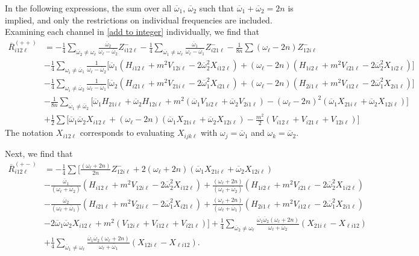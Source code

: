 \documentclass[letterpaper,11pt]{article}
\newcommand{\oi}{\omega_i}
\newcommand{\ol}{\omega_\ell}
\newcommand{\oone}{\overline{\omega}_1}
\newcommand{\otwo}{\overline{\omega}_2}
\begin{document}
In the following expressions, the sum over all $\oone$, $\otwo$ such that $\oone + \otwo = 2n$ is implied, and only the restrictions on individual frequencies are included. Examining each channel in \eqref{add to integer} individually, we find that
\begin{align}
\label{R1}
\overline{R}^{(++)}_{i 1 2 \ell} &= - \frac{1}{4} \sum_{\otwo \neq \ol} \frac{\otwo}{\ol - \otwo} Z^{-}_{i12\ell} - \frac{1}{4} \sum_{\oone \neq \ol} \frac{\oone}{\ol - \oone} Z^{-}_{i21\ell} - \frac{1}{8n} \sum \left( \ol - 2n \right) Z^-_{12i\ell} \nonumber \\
%
& - \frac{1}{4} \sum_{\oi \neq \oone} \frac{1}{\ol - \otwo} \Big[ \oone \left( H_{i12\ell} + m^2 V_{12i\ell} - 2 \otwo^2 X_{i12\ell} \right) + (\ol - 2n) \left( H_{1i2\ell} + m^2 V_{i21\ell} - 2\otwo^2 X_{1i2\ell} \right)\Big] \nonumber \\
%
& - \frac{1}{4} \sum_{\oi \neq \otwo} \frac{1}{\ol - \oone} \Big[ \otwo \left( H_{i21\ell} + m^2 V_{21i\ell} - 2\oone^2 X_{i21\ell} \right) + (\ol - 2n) \left( H_{2i1\ell} + m^2 V_{i12\ell} - 2\oone^2 X_{2i1\ell} \right) \Big] \nonumber \\
%
& - \frac{1}{8n} \sum_{\oone \neq \otwo} \Big[ \oone H_{21i\ell} + \otwo H_{12i\ell} + m^2 \left( \oone V_{1i2\ell} + \otwo V_{2i1\ell} \right) - \left( \ol - 2n \right)^2 \left(\oone X_{21i\ell} + \otwo X_{12i\ell} \right) \Big] \nonumber \\
%
& + \frac{1}{2} \sum \Big[ \oone\otwo X_{i12\ell} + \left( \ol - 2n \right)\left( \oone X_{21i\ell} + \otwo X_{12i\ell} \right) - \frac{m^2}{2} \left( V_{i12\ell} + V_{i21\ell} + V_{12i\ell} \right) \Big]
\end{align}
The notation $X_{i12\ell}$ corresponds to evaluating $X_{ijk\ell}$ with $\omega_j = \oone$ and $\omega_k = \otwo$. 

Next, we find that
\begin{align}
\label{R2}
\overline{R}_{i12\ell}^{(+-)} &= - \frac{1}{4} \sum \Big[ \frac{(\ol + 2n)}{2n} Z^-_{12i\ell} + 2 (\ol + 2n) \left( \oone X_{21i\ell} + \otwo X_{12i\ell} \right) \nonumber \\
%
& -\frac{\oone}{(\ol + \otwo)} \left( H_{i12\ell} + m^2 V_{12i\ell} - 2 \otwo^2 X_{i12\ell} \right) + \frac{(\ol + 2n)}{(\ol + \otwo)} \left( H_{1i2\ell} + m^2 V_{i21\ell} - 2\otwo^2 X_{1i2\ell} \right)  \nonumber \\
%
&- \frac{\otwo}{(\ol + \oone)} \left( H_{i21\ell} + m^2 V_{21i\ell} - 2\oone^2 X_{i21\ell} \right) + \frac{(\ol + 2n)}{(\ol + \oone)} \left(H_{2i1\ell} + m^2 V_{i12\ell} - 2\oone^2 X_{2i1\ell} \right)  \nonumber \\
%
&  - 2 \oone\otwo X_{i12\ell} + m^2 \left( V_{12i\ell} + V_{i12\ell} + V_{i21\ell} \right) \Big] + \frac{1}{4} \sum_{\otwo \neq \ol} \frac{\oone\otwo(\ol + 2n)}{\ol + \otwo} \left( X_{21i\ell} - X_{\ell i 12} \right) \nonumber \\
%
& + \frac{1}{4} \sum_{\oone \neq \ol} \frac{\oone\otwo(\ol + 2n)}{\ol + \oone} \left( X_{12i\ell} - X_{\ell i 12} \right).
\end{align}
\end{document}
